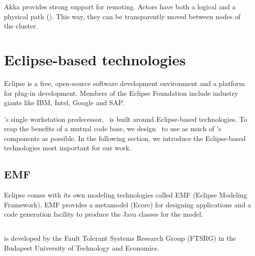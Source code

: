
Akka provides strong support for remoting. Actors have both a logical and a physical path (). This way, they can be transparently moved between nodes of the cluster.


\section{Eclipse-based technologies}

Eclipse is a free, open-source software development environment and a platform for plug-in development. Members of the Eclipse Foundation include industry giants like IBM, Intel, Google and SAP.

\iqd's single workstation predecessor, \eiq\ is built around Eclipse-based technologies. To reap the benefits of a mutual code base, we design \iqd\ to use as much of \eiq's components as possible. In the following section, we introduce the Eclipse-based technologies most important for our work.  

\subsection{EMF}

Eclipse comes with its own modeling technologies called EMF (Eclipse Modeling Framework). EMF provides a metamodel (Ecore) for designing applications and a code generation facility to produce the Java classes for the model.

\subsection{\eiq}

\eiq is developed by the Fault Tolerant Systems Research Group (FTSRG) in the Budapest University of Technology and Economics. 


